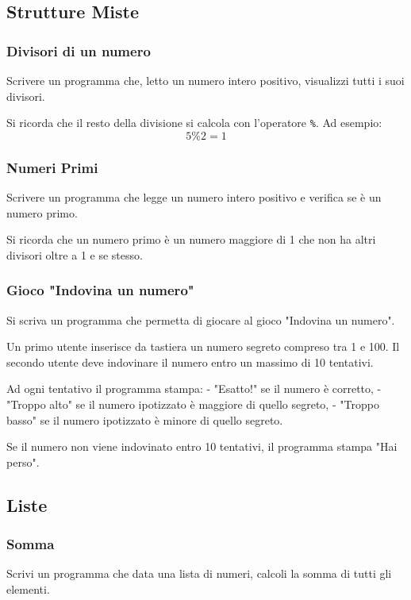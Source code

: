 \documentclass[a4paper,12pt]{article}
\begin{document}
	
	\newpage
	
	\subsection{Strutture Miste}
	\subsubsection{Divisori di un numero}
	Scrivere un programma che, letto un numero intero positivo, visualizzi tutti i suoi divisori.
	
	Si ricorda che il resto della divisione si calcola con l’operatore \texttt{\%}.  
	Ad esempio:  
	\[
	5 \% 2 = 1
	\]
	
	
	\subsubsection{Numeri Primi}
	Scrivere un programma che legge un numero intero positivo e verifica se è un numero primo.
	
	Si ricorda che un numero primo è un numero maggiore di 1 che non ha altri divisori oltre a 1 e se stesso.
	
	
	
	\subsubsection{Gioco "Indovina un numero"}
	
	Si scriva un programma che permetta di giocare al gioco "Indovina un numero".  
	
	Un primo utente inserisce da tastiera un numero segreto compreso tra 1 e 100.  
	Il secondo utente deve indovinare il numero entro un massimo di 10 tentativi.  
	
	Ad ogni tentativo il programma stampa:
	- "Esatto!" se il numero è corretto,  
	- "Troppo alto" se il numero ipotizzato è maggiore di quello segreto,  
	- "Troppo basso" se il numero ipotizzato è minore di quello segreto.  
	
	Se il numero non viene indovinato entro 10 tentativi, il programma stampa "Hai perso".
	
	
	\subsection{Liste}
	
	
	
	\subsubsection{Somma}
	Scrivi un programma che data una lista di numeri, calcoli la somma di tutti gli elementi.
	
\end{document}
